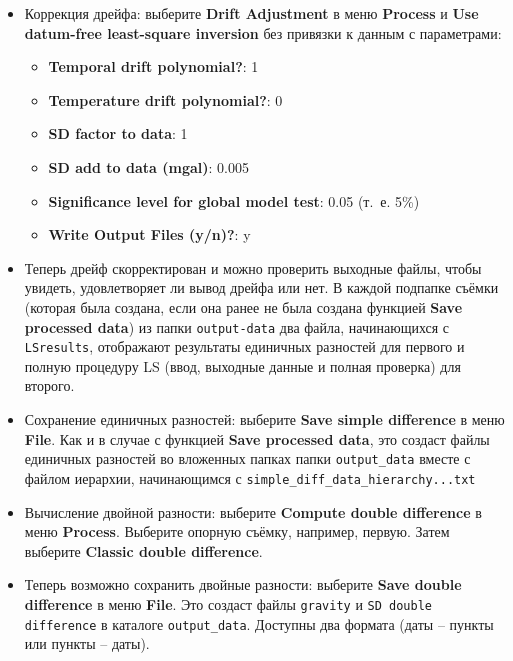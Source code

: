 \begin{itemize}
    \item Коррекция дрейфа: выберите \textbf{Drift Adjustment} в меню
    \textbf{Process} и \textbf{Use datum-free least-square inversion} без
    привязки к данным с параметрами:
    \begin{itemize}
        \item \textbf{Temporal drift polynomial?}: 1
        \item \textbf{Temperature drift polynomial?}: 0
        \item \textbf{SD factor to data}: 1
        \item \textbf{SD add to data (mgal)}: 0.005
        \item \textbf{Significance level for global model test}: 0.05 (т.~е. 5\%)
        \item \textbf{Write Output Files (y/n)?}: y
    \end{itemize}

    \item Теперь дрейф скорректирован и можно проверить выходные файлы, чтобы
    увидеть, удовлетворяет ли вывод дрейфа или нет. В каждой подпапке съёмки 
    (которая была создана, если она ранее не была создана функцией \textbf{Save
    processed data}) из папки \verb|output-data| два файла, начинающихся с
    \verb|LSresults|, отображают результаты единичных разностей для первого и полную
    процедуру LS (ввод, выходные данные и полная проверка) для второго.

    \item Сохранение единичных разностей: выберите \textbf{Save simple difference} в меню
    \textbf{File}. Как и в случае с функцией \textbf{Save processed data}, это создаст
    файлы единичных разностей во вложенных папках папки \verb|output_data| вместе с файлом
    иерархии, начинающимся с \verb|simple_diff_data_hierarchy...txt|

    \item Вычисление двойной разности: выберите \textbf{Compute double difference} в меню
    \textbf{Process}. Выберите опорную съёмку, например, первую. Затем выберите
    \textbf{Classic double difference}.

    \item Теперь возможно сохранить двойные разности: выберите \textbf{Save
    double difference} в меню \textbf{File}. Это создаст файлы \verb|gravity| и
    \verb|SD double difference| в каталоге \verb|output_data|. Доступны два
    формата (даты -- пункты или пункты -- даты).


\end{itemize}
